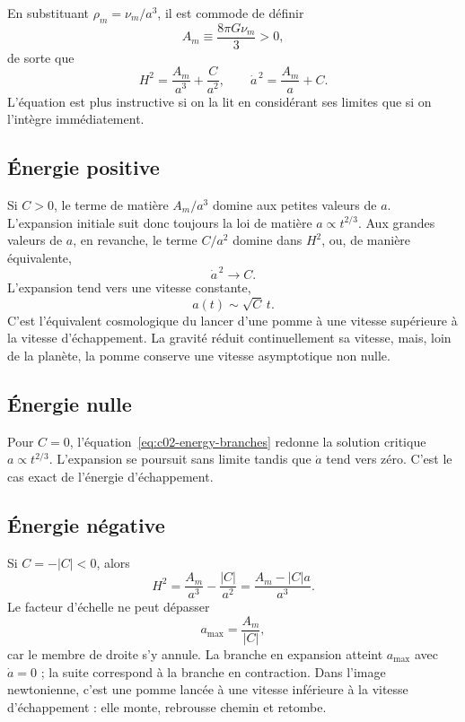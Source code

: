 En substituant \(\rho_m=\nu_m/a^3\), il est commode de définir
\begin{equation}
A_m\equiv\frac{8\pi G\nu_m}{3}>0,
\end{equation}
de sorte que
\begin{equation}
H^2=\frac{A_m}{a^3}+\frac{C}{a^2},
\qquad
\dot a^{\,2}=\frac{A_m}{a}+C.
\label{eq:c02-energy-branches}
\end{equation}
L’équation est plus instructive si on la lit en considérant ses limites que si on l’intègre immédiatement.

\subsection{Énergie positive}

Si \(C>0\), le terme de matière \(A_m/a^3\) domine aux petites valeurs de \(a\). L’expansion initiale suit donc toujours la loi de matière \(a\propto t^{2/3}\). Aux grandes valeurs de \(a\), en revanche, le terme \(C/a^2\) domine dans \(H^2\), ou, de manière équivalente,
\begin{equation}
\dot a^{\,2}\longrightarrow C.
\end{equation}
L’expansion tend vers une vitesse constante,
\begin{equation}
a(t)\sim\sqrt C\,t.
\label{eq:c02-positive-late}
\end{equation}
C’est l’équivalent cosmologique du lancer d’une pomme à une vitesse supérieure à la vitesse d’échappement. La gravité réduit continuellement sa vitesse, mais, loin de la planète, la pomme conserve une vitesse asymptotique non nulle.

\subsection{Énergie nulle}

Pour \(C=0\), l’équation~\eqref{eq:c02-energy-branches} redonne la solution critique \(a\propto t^{2/3}\). L’expansion se poursuit sans limite tandis que \(\dot a\) tend vers zéro. C’est le cas exact de l’énergie d’échappement.

\subsection{Énergie négative}

Si \(C=-|C|<0\), alors
\begin{equation}
H^2=\frac{A_m}{a^3}-\frac{|C|}{a^2}
=\frac{A_m-|C|a}{a^3}.
\label{eq:c02-negative-energy}
\end{equation}
Le facteur d’échelle ne peut dépasser
\begin{equation}
a_{\max}=\frac{A_m}{|C|},
\label{eq:c02-amax}
\end{equation}
car le membre de droite s’y annule. La branche en expansion atteint \(a_{\max}\) avec \(\dot a=0\) ; la suite correspond à la branche en contraction. Dans l’image newtonienne, c’est une pomme lancée à une vitesse inférieure à la vitesse d’échappement : elle monte, rebrousse chemin et retombe.

